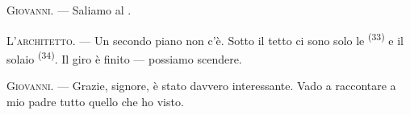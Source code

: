 \textsc{Giovanni}. --- Saliamo al .

\textsc{L'architetto}. --- Un secondo piano non c'è. Sotto il tetto ci sono solo le
 \textsuperscript{(33)} e il solaio \textsuperscript{(34)}. Il giro è
finito --- possiamo scendere.

\textsc{Giovanni}. --- Grazie, signore, è stato davvero interessante. Vado a raccontare
a mio padre tutto quello che ho visto.
\VUsaut{4.0mm}
\VUfilet{22mm}
